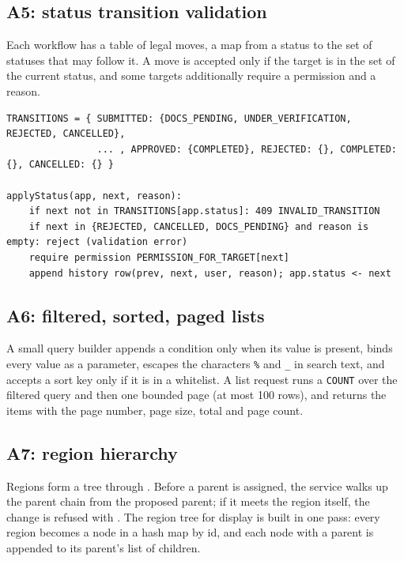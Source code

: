 
\subsection{A5: status transition validation}
Each workflow has a table of legal moves, a map from a status to the set of statuses
that may follow it. A move is accepted only if the target is in the set of the current
status, and some targets additionally require a permission and a reason.
\begin{lstlisting}[language={},mathescape=false]
TRANSITIONS = { SUBMITTED: {DOCS_PENDING, UNDER_VERIFICATION, REJECTED, CANCELLED},
                ... , APPROVED: {COMPLETED}, REJECTED: {}, COMPLETED: {}, CANCELLED: {} }

applyStatus(app, next, reason):
    if next not in TRANSITIONS[app.status]: 409 INVALID_TRANSITION
    if next in {REJECTED, CANCELLED, DOCS_PENDING} and reason is empty: reject (validation error)
    require permission PERMISSION_FOR_TARGET[next]
    append history row(prev, next, user, reason); app.status <- next
\end{lstlisting}

\subsection{A6: filtered, sorted, paged lists}
A small query builder appends a condition only when its value is present, binds every value
as a parameter, escapes the characters \texttt{\%} and \texttt{\_} in search text, and
accepts a sort key only if it is in a whitelist. A list request runs a \texttt{COUNT} over
the filtered query and then one bounded page (at most 100 rows), and returns the items with
the page number, page size, total and page count.

\subsection{A7: region hierarchy}
Regions form a tree through . Before a parent is assigned, the
service walks up the parent chain from the proposed parent; if it meets the region
itself, the change is refused with . The region tree for display is built in
one pass: every region becomes a node in a hash map by id, and each node with a parent is
appended to its parent's list of children.

